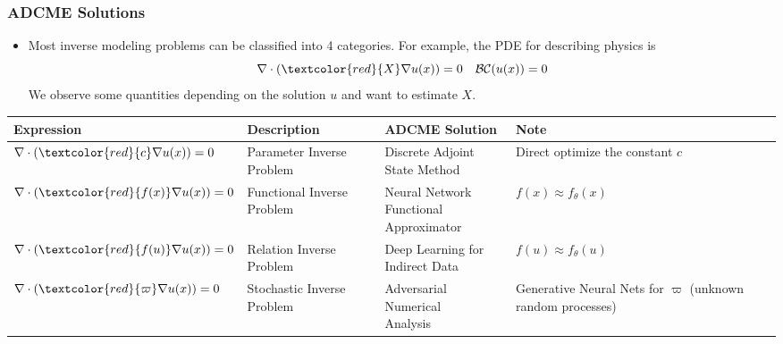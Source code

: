 \documentclass{beamer}
\begin{document}
\begin{frame}
	\frametitle{ADCME Solutions}
\begin{itemize}
	\item Most inverse modeling problems can be classified into 4 categories. For example, the PDE for describing physics is
	\begin{equation}
		\nabla \cdot (\textcolor{red}{X} \nabla u(x)) = 0\quad \mathcal{B}\mathcal{C}(u(x)) = 0
	\end{equation}
	We observe some quantities depending on the solution $u$ and want to estimate $X$.
\end{itemize}
{
\tiny
\begin{table}[]
\begin{tabular}{@{}llll@{}}
\toprule
Expression                                       & Description                & ADCME Solution                         & Note                                     \\ \midrule
$\nabla \cdot (\textcolor{red}{c} \nabla u(x)) = 0$ & Parameter Inverse Problem  & \makecell{Discrete Adjoint\\ State Method}          & Direct optimize the constant $c$                      \\ \hline
$\nabla \cdot (\textcolor{red}{f(x)} \nabla u(x)) = 0$ & Functional Inverse Problem & \makecell{Neural Network \\ Functional Approximator} & $f(x) \approx f_{\theta}(x)$             \\ \hline
$\nabla \cdot (\textcolor{red}{f(u)} \nabla u(x)) = 0$ & Relation Inverse Problem   & \makecell{Deep Learning for\\ Indirect Data}        & $f(u) \approx f_{\theta}(u)$             \\ \hline
$\nabla \cdot (\textcolor{red}{\varpi} \nabla u(x)) = 0$ & Stochastic Inverse Problem & \makecell{Adversarial Numerical\\ Analysis}         & \makecell{Generative Neural Nets for $\varpi$\\ (unknown random processes)} \\ \bottomrule
\end{tabular}
\end{table}
}
\end{frame}
\end{document}
